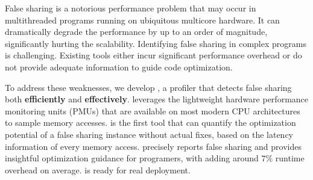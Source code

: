 
False sharing is a notorious performance problem that may occur in multithreaded programs running on ubiquitous multicore hardware. It can dramatically degrade the performance by up to an order of magnitude, significantly hurting the scalability. Identifying false sharing in complex programs is challenging. Existing tools either incur significant performance overhead or do not provide adequate information to guide code optimization.

\sloppy
To address these weaknesses, we develop \cheetah{}, a profiler that detects false sharing both {\bf efficiently} and {\bf effectively}. \cheetah{} leverages the lightweight hardware performance monitoring units (PMUs) that are available on most modern CPU architectures to sample memory accesses. \cheetah{} is the first tool that can quantify the optimization potential of a false sharing instance without actual fixes, based on the latency information of every memory access. \cheetah{} precisely reports false sharing and provides insightful optimization guidance for programers, with adding around $7\%$ runtime overhead on average. \Cheetah{} is ready for real deployment. 

